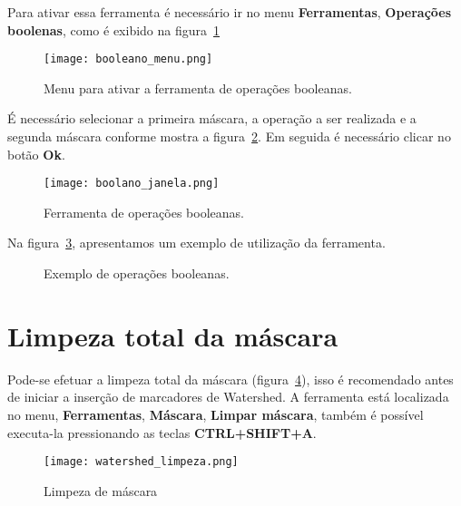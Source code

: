 Para ativar essa ferramenta é necessário ir no menu \textbf{Ferramentas}, \textbf{Operações boolenas}, como é exibido na figura~\ref{fig:booleano_menu} 

\begin{figure}[!htb]
\centering
\texttt{[image: booleano\_menu.png]}
\caption{Menu para ativar a ferramenta de operações booleanas.}
\label{fig:booleano_menu}
\end{figure}

É necessário selecionar a primeira máscara, a operação a ser realizada e a segunda máscara conforme mostra a figura~\ref{fig:booleano_janela}. Em seguida é necessário clicar no botão \textbf{Ok}.

\begin{figure}[!htb]
\centering
\texttt{[image: boolano\_janela.png]}
\caption{Ferramenta de operações booleanas.}
\label{fig:booleano_janela}
\end{figure}

Na figura~\ref{fig:op_boolana}, apresentamos um exemplo de utilização da ferramenta.

\begin{figure}[!htb]
  \centering
  \hfill
  \hfill  
  \hfill  
  \hfill  
  \hfill  
  \caption{Exemplo de operações booleanas.}
  \label{fig:op_boolana}
\end{figure}

\section{Limpeza total da máscara}
\label{cap:limpeza_mascara}

Pode-se efetuar a limpeza total da máscara (figura~\ref{fig:limpeza_mascara}), isso é recomendado antes de iniciar a inserção de marcadores de Watershed. A ferramenta está localizada no menu, \textbf{Ferramentas}, \textbf{Máscara}, \textbf{Limpar máscara}, também é possível executa-la pressionando as teclas \textbf{CTRL+SHIFT+A}.

\begin{figure}[!htb]
\centering
\texttt{[image: watershed\_limpeza.png]}
\caption{Limpeza de máscara}
\label{fig:limpeza_mascara}
\end{figure}